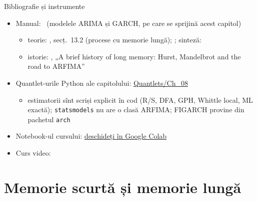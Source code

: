 \begin{frame}{Bibliografie și instrumente}
\itemsize{\small}
\begin{itemize}
    \item Manual: \ (modelele ARIMA și GARCH, pe care se sprijină acest capitol)
    \begin{itemize}
        \item teorie: , secț.~13.2 (procese cu memorie lungă); ; sinteză: 
        \item istorie: , „A brief history of long memory: Hurst, Mandelbrot and the road to ARFIMA”
    \end{itemize}
    \item Quantlet-urile Python ale capitolului: \href{https://github.com/danpele/Time-Series-Analysis/tree/main/Quantlets/Ch_08}{Quantlets/Ch\_08}
    \begin{itemize}
        \item estimatorii sînt scriși explicit în cod (R/S, DFA, GPH, Whittle local, ML exactă); \texttt{statsmodels} nu are o clasă ARFIMA; FIGARCH provine din pachetul \texttt{arch}
    \end{itemize}
    \item Notebook-ul cursului: \href{\colaburl{notebooks/EN/chapter8_lecture_notebook.ipynb}}{deschideți în Google Colab}
    \item Curs video: 
\end{itemize}
\end{frame}


\section{Memorie scurtă și memorie lungă}

